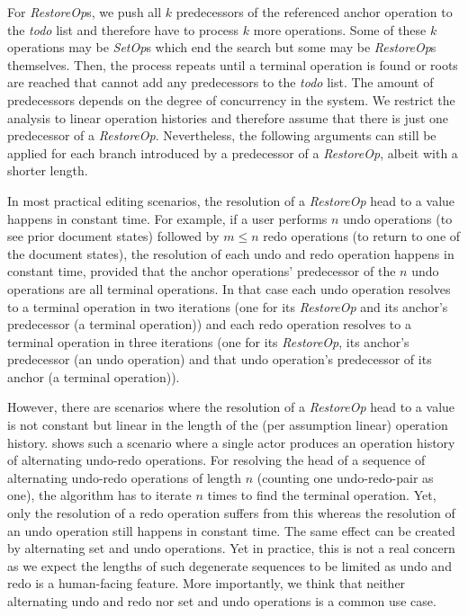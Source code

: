 \documentclass[sigplan,natbib=false,review]{acmart}
\newcommand{\setopkind}{\textit{SetOp}}
\newcommand{\restopkind}{\textit{RestoreOp}}
\begin{document}
For \restopkind{}s, we push all $k$ predecessors of the referenced anchor operation
to the \textit{todo} list and therefore have to process $k$ more operations.
Some of these $k$ operations may be \setopkind{}s which end the search but
some may be \restopkind{}s themselves. 
Then, the process repeats until a terminal operation is found or
roots are reached that cannot add any predecessors to the \textit{todo} list.
The amount of predecessors depends on the degree of concurrency in the system.
We restrict the analysis to linear operation histories and therefore assume
that there is just one predecessor of a \restopkind{}.
Nevertheless, the following arguments can still be applied for each branch
introduced by a predecessor of a \restopkind{}, albeit with a shorter length.

In most practical editing scenarios,
the resolution of a \restopkind{} head to a value happens in constant time.
For example, if a user performs $n$ undo operations (to see prior document states)
followed by $m \leq n$ redo operations (to return to one of the document states),
the resolution of each undo and redo operation happens in constant time,
provided that the anchor operations' predecessor of the $n$ undo operations
are all terminal operations.
In that case each undo operation resolves to a terminal operation in two iterations
(one for its \restopkind{} and its anchor's predecessor (a terminal operation))
and each redo operation resolves
to a terminal operation in three iterations
(one for its \restopkind{}, its anchor's
predecessor (an undo operation) and that undo operation's predecessor of its anchor
(a terminal operation)).

However, there are scenarios where the resolution of a \restopkind{} head
to a value is not constant but linear in the length
of the (per assumption linear) operation history.
 shows such a scenario where a single actor
produces an operation history of alternating undo-redo operations.
For resolving the head of a sequence of alternating undo-redo operations
of length $n$ (counting one undo-redo-pair as one),
the algorithm has to iterate $n$ times to find the terminal operation.
Yet, only the resolution of a redo operation suffers from this whereas
the resolution of an undo operation still happens in constant time.
The same effect can be created by alternating set and undo operations.
Yet in practice, this is not a real concern as we expect the lengths of such
degenerate sequences to be limited as undo and redo is a human-facing feature.
More importantly, we think that neither alternating undo and redo
nor set and undo operations is a common use case.
\end{document}
